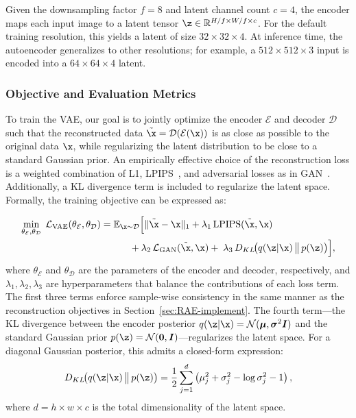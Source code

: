 \documentclass[../../book-main.tex]{subfiles}
\begin{document}
Given the downsampling factor $f = 8$ and latent channel count $c =
4$, the encoder maps each input image to a latent tensor $\z \in
\mathbb{R}^{H/f \times W/f \times c}$. For the default training
resolution, this yields a latent of size $32 \times 32 \times 4$. At
inference time, the autoencoder generalizes to other resolutions; for
example, a $512 \times 512 \times 3$ input is encoded into a $64
\times 64 \times 4$ latent.

\subsubsection{Objective and Evaluation Metrics}
To train the VAE, our goal is to jointly optimize the encoder
$\mathcal{E}$ and decoder $\mathcal{D}$ such that the reconstructed
data $\tilde{\x} = \mathcal{D}(\mathcal{E}(\x))$ is as close as
possible to the original data $\x$, while regularizing the latent
distribution to be close to a standard Gaussian prior. An empirically
effective choice of the reconstruction loss is a weighted combination
of L1, LPIPS~\citep{zhang2018unreasonable}, and adversarial losses as
in GAN~\citep{goodfellow2014generative}. Additionally, a KL
divergence term is included to regularize the latent space. Formally,
the training objective can be expressed as:

\begin{align}
\label{eq:vae_loss}
\min_{\theta_{\mathcal{E}}, \theta_{\mathcal{D}}} \;
\mathcal{L}_{\mathrm{VAE}}(\theta_{\mathcal{E}}, \theta_{\mathcal{D}})
&= \mathbb{E}_{\x \sim \mathcal{D}} \Big[
    \|\tilde{\x} - \x\|_1 + \lambda_1 \, \mathrm{LPIPS}(\tilde{\x}, \x) \\
    &\qquad\quad + \lambda_2 \,
    \mathcal{L}_{\mathrm{GAN}}(\tilde{\x}, \x) + \; \lambda_3 \,
    D_{KL}\!\big(q(\z | \x) \,\big\|\, p(\z)\big)
\Big],
\end{align}
where $\theta_{\mathcal{E}}$ and $\theta_{\mathcal{D}}$ are the
parameters of the encoder and decoder, respectively, and $\lambda_1,
\lambda_2, \lambda_3$ are hyperparameters that balance the
contributions of each loss term. The first three terms enforce
sample-wise consistency in the same manner as the reconstruction
objectives in Section~\ref{sec:RAE-implement}. The fourth term---the
KL divergence between the encoder posterior $q(\z | \x) =
\mathcal{N}(\boldsymbol{\mu}, \boldsymbol{\sigma}^2 \boldsymbol{I})$
and the standard Gaussian prior $p(\z) = \mathcal{N}(\boldsymbol{0},
\boldsymbol{I})$---regularizes the latent space. For a diagonal
Gaussian posterior, this admits a closed-form expression:
\begin{equation}
D_{KL}\!\big(q(\z | \x) \,\big\|\, p(\z)\big) = \frac{1}{2}
\sum_{j=1}^{d} \left( \mu_j^2 + \sigma_j^2 - \log \sigma_j^2 - 1 \right),
\end{equation}
where $d = h \times w \times c$ is the total dimensionality of the latent space.
\end{document}
